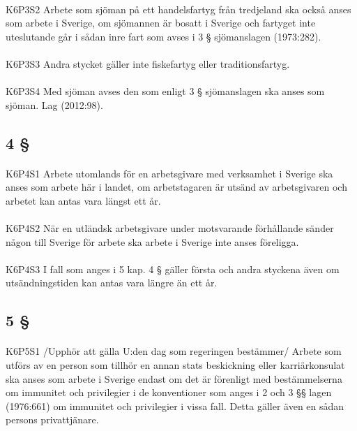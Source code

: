 \documentclass[a4paper,notitlepage,openany,10pt]{book}
\begin{document}
\paragraph*{}
{\tiny K6P3S2}
Arbete som sjöman på ett handelsfartyg från tredjeland ska också anses som arbete i Sverige, om sjömannen är bosatt i Sverige och fartyget inte uteslutande går i sådan inre fart som avses i 3 § sjömanslagen (1973:282).
\paragraph*{}
{\tiny K6P3S3}
Andra stycket gäller inte fiskefartyg eller traditionsfartyg.
\paragraph*{}
{\tiny K6P3S4}
Med sjöman avses den som enligt 3 § sjömanslagen ska anses som sjöman.
Lag (2012:98).
\subsection*{4 §}
\paragraph*{}
{\tiny K6P4S1}
Arbete utomlands för en arbetsgivare med verksamhet i Sverige ska anses som arbete här i landet, om arbetstagaren är utsänd av arbetsgivaren och arbetet kan antas vara längst ett år.
\paragraph*{}
{\tiny K6P4S2}
När en utländsk arbetsgivare under motsvarande förhållande sänder någon till Sverige för arbete ska arbete i Sverige inte anses föreligga.
\paragraph*{}
{\tiny K6P4S3}
I fall som anges i 5 kap. 4 § gäller första och andra styckena även om utsändningstiden kan antas vara längre än ett år.
\subsection*{5 §}
\paragraph*{}
{\tiny K6P5S1}
/Upphör att gälla U:den dag som regeringen bestämmer/
Arbete som utförs av en person som tillhör en annan stats beskickning eller karriärkonsulat ska anses som arbete i Sverige endast om det är förenligt med bestämmelserna om immunitet och privilegier i de konventioner som anges i 2 och 3 §§ lagen (1976:661) om immunitet och privilegier i vissa fall. Detta gäller även en sådan persons privattjänare.
\end{document}
